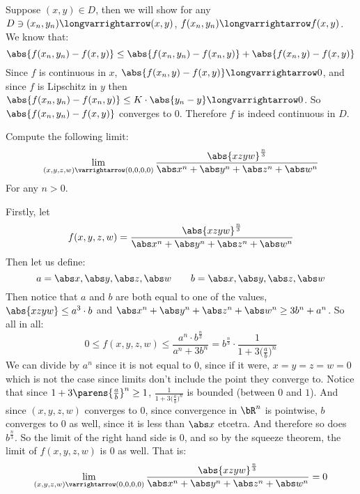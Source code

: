 \documentclass[10pt]{article}
\begin{document}
\begin{blankpp}

        Suppose $(x,y)\in D$, then we will show for any $D\ni(x_n,y_n)\longvarrightarrow(x,y)$, $f(x_n,y_n)\longvarrightarrow f(x,y)$.
        We know that:
        \[ \abs{f(x_n,y_n) - f(x,y)} \leq \abs{f(x_n,y_n) - f(x_n,y)} + \abs{f(x_n,y) - f(x,y)} \]
        Since $f$ is continuous in $x$, $\abs{f(x_n,y)-f(x,y)}\longvarrightarrow0$, and since $f$ is Lipschitz in $y$ then $\abs{f(x_n,y_n)-f(x_n,y)}\leq K\cdot\abs{y_n-y}\longvarrightarrow0$.
        So $\abs{f(x_n,y_n) - f(x,y)}$ converges to $0$.
        Therefore $f$ is indeed continuous in $D$.

\end{blankpp}

\begin{exercise*}

    Compute the following limit:
        \[ \lim_{(x,y,z,w)\varrightarrow(0,0,0,0)}\frac{\abs{xzyw}^{\frac n3}}{\abs x^n+\abs y^n+\abs z^n+\abs w^n} \]
    For any $n>0$.

\end{exercise*}

\begin{blankpp}

    Firstly, let
        \[ f(x,y,z,w) = \frac{\abs{xzyw}^{\frac n3}}{\abs x^n+\abs y^n+\abs z^n+\abs w^n} \]
    Then let us define:
        \[ a = \maxof{\abs x,\abs y,\abs z,\abs w}\qquad b = \minof{\abs x,\abs y,\abs z,\abs w} \]
    Then notice that $a$ and $b$ are both equal to one of the values, $\abs{xzyw}\leq a^3\cdot b$ and $\abs x^n+\abs y^n+\abs z^n+\abs w^n\geq 3b^n+a^n$.
    So all in all:
        \[ 0\leq f(x,y,z,w) \leq \frac{a^n\cdot b^{\frac n3}}{a^n+3b^n} = b^{\frac n3}\cdot\frac1{1+3\bigl(\frac ab\bigr)^n} \]
    We can divide by $a^n$ since it is not equal to $0$, since if it were, $x=y=z=w=0$ which is not the case since limits don't include the point they converge to.
    Notice that since $1+3\parens{\frac ab}^n\geq 1$, $\frac1{1+3\bigl(\frac ab\bigr)^n}$ is bounded (between $0$ and $1$).
    And since $(x,y,z,w)$ converges to $0$, since convergence in $\bR^n$ is pointwise, $b$ converges to $0$ as well, since it is less than $\abs x$ etcetra.
    And therefore so does $b^{\frac n3}$.
    So the limit of the right hand side is $0$, and so by the squeeze theorem, the limit of $f(x,y,z,w)$ is $0$ as well.
    That is:
        \[ \lim_{(x,y,z,w)\varrightarrow(0,0,0,0)}\frac{\abs{xzyw}^{\frac n3}}{\abs x^n+\abs y^n+\abs z^n+\abs w^n} = 0 \]

\end{blankpp}
\end{document}
